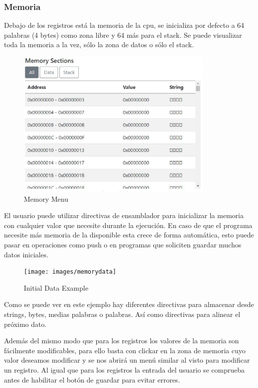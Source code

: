 {        \newpage
        \subsubsection{Memoria}
        {
            Debajo de los registros está la memoria de la cpu, se inicializa por defecto a 64 palabras (4 bytes)
            como zona libre y 64 más para el stack. Se puede visualizar toda la memoria a la vez, sólo la zona de datos o sólo el stack.

            \begin{figure}[h]
                \centering
                \includegraphics[width=0.85\textwidth]{images/memory}
                \caption{Memory Menu}
            \end{figure}

            El usuario puede utilizar directivas de ensamblador para inicializar la memoria
            con cualquier valor que necesite durante la ejecución. En caso de que el programa necesite más memoria de la disponible esta crece de forma automática, esto puede pasar
            en operaciones como push o en programas que soliciten guardar muchos datos iniciales.

            \begin{figure}[h]
                \centering
                \texttt{[image: images/memorydata]}
                \caption{Initial Data Example}
            \end{figure}
            Como se puede ver en este ejemplo hay diferentes directivas para almacenar desde strings, bytes, medias palabras
            o palabras. Así como directivas para alinear el próximo dato.

            Además del mismo modo que para los registros los valores de la memoria son fácilmente modificables,
            para ello basta con clickar en la zona de memoria cuyo valor deseamos modificar y se nos abrirá un menú similar al visto
            para modificar un registro. Al igual que para los registros la entrada del usuario se comprueba antes de habilitar el botón de guardar para evitar errores.

}}
